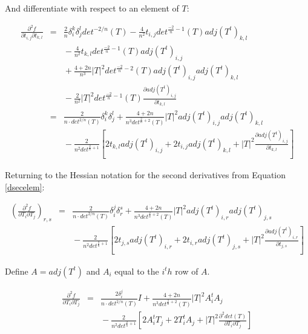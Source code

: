 \documentclass{report}
\begin{document}
And differentiate with respect to an element of $T$:

\begin{eqnarray}
\nonumber
\frac{\partial^2 f}{\partial t_{i,j} \partial t_{k,l}} & = &
\frac{2}{n} \delta_i^k \delta_j^l det^{-2/n}(T) 
  - \frac{4}{n^2} t_{i,j} det^{\frac{-2}{n}-1}(T) adj(T^t)_{k,l} \\
\nonumber
  & & {} - \frac{4}{n^2}t_{k,l} det^{\frac{-2}{n} - 1}(T) adj(T^t)_{i,j} \\
\nonumber
  & & {} + \frac{4+2n}{n^3} |T|^2 det^{\frac{-2}{n} - 2}(T) adj(T^t)_{i,j} adj(T^t)_{k,l} \\
  & & {} - \frac{2}{n^2} |T|^2 det^{\frac{-2}{n} - 1}(T) \frac{\partial adj(T^t)_{i,j}}{\partial t_{k,l}} \\
 & = & \frac{2}{n \cdot det^{2/n}(T)} \delta_i^k \delta_j^l
     + \frac{4 + 2n}{n^3 det^{\frac{2}{n}+2}(T)} |T|^2 adj(T^t)_{i,j} adj(T^t)_{k,l} \\
\nonumber
& & {} - \frac{2}{n^2 det^{\frac{2}{n}+1}} \left[ 
     2 t_{k,l} adj(T^t)_{i,j} + 2 t_{i,j} adj(T^t)_{k,l}
     + |T|^2 \frac{\partial adj(T^t)_{i,j}}{\partial t_{k,l}} \right] 
\end{eqnarray}

Returning to the Hessian notation for the second derivatives from Equation \ref{dsecelem}:


\begin{eqnarray}
\left(\frac{\partial^2 f}{\partial T_i \partial T_j}\right)_{r,s} &=&
\frac{2}{n \cdot det^{2/n}(T)} \delta_i^j \delta_r^s
     + \frac{4 + 2n}{n^3 det^{\frac{2}{n}+2}(T)} |T|^2 adj(T^t)_{i,r} adj(T^t)_{j,s} \\
\nonumber
& & {} - \frac{2}{n^2 det^{\frac{2}{n}+1}} \left[ 
     2 t_{j,s} adj(T^t)_{i,r} + 2 t_{i,r} adj(T^t)_{j,s}
     + |T|^2 \frac{\partial adj(T^t)_{i,r}}{\partial t_{j,s}} \right] 
\end{eqnarray}

Define $A = adj(T^t)$ and $A_i$ equal to the $i^th$ row of $A$.

\begin{eqnarray}
\frac{\partial^2 f}{\partial T_i \partial T_j}
&=& \frac{2 \delta_i^j}{n \cdot det^{2/n}(T)} I
+ \frac{4 + 2n}{n^3 det^{\frac{2}{n}+2}(T)} |T|^2 A_i^t A_j \\ \nonumber
& & {} - \frac{2}{n^2 det^{\frac{2}{n}+1}} \left[ 
2 A_i^t T_j + 2 T_i^t A_j + |T|^2 \frac{\partial^2 det(T)}{\partial T_i \partial T_j} \right]
\end{eqnarray}
\end{document}
